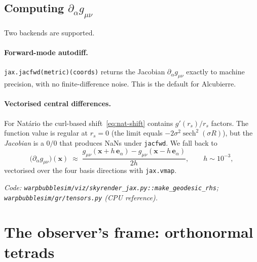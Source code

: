 \documentclass[11pt]{article}
\begin{document}
\subsection{Computing $\partial_\alpha g_{\mu\nu}$}

Two backends are supported.

\paragraph{Forward-mode autodiff.}
\texttt{jax.jacfwd(metric)(coords)} returns the Jacobian
$\partial_\alpha g_{\mu\nu}$ exactly to machine precision, with no
finite-difference noise.  This is the default for Alcubierre.

\paragraph{Vectorised central differences.}
For Natário the curl-based shift~\eqref{eq:nat-shift} contains
$g'(r_s)/r_s$ factors.  The function value is regular at $r_s\!=\!0$
(the limit equals $-2\sigma^2\operatorname{sech}^2(\sigma R)$), but the
\emph{Jacobian} is a $0/0$ that produces NaNs under \texttt{jacfwd}.  We
fall back to
\begin{equation}
\bigl(\partial_\alpha g_{\mu\nu}\bigr)(\bm x)
\;\approx\;
\frac{g_{\mu\nu}(\bm x + h\,\bm e_\alpha) - g_{\mu\nu}(\bm x - h\,\bm e_\alpha)}{2h},
\qquad h \sim 10^{-3},
\end{equation}
vectorised over the four basis directions with \texttt{jax.vmap}.

\smallskip
\noindent\emph{Code: \texttt{warpbubblesim/viz/skyrender\_jax.py::make\_geodesic\_rhs}; \texttt{warpbubblesim/gr/tensors.py} (CPU reference).}

\section{The observer's frame: orthonormal tetrads}
\end{document}
